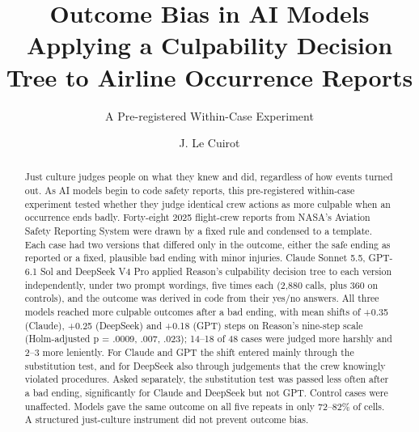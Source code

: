 \documentclass{aer}
\begin{document}

\title{Outcome Bias in AI Models Applying a Culpability Decision Tree to Airline Occurrence Reports}
\subtitle{A Pre-registered Within-Case Experiment}

\author{J. Le Cuirot}

\maketitle

\begin{abstract}
Just culture judges people on what they knew and did, regardless of how events turned out. As AI models begin to code safety reports, this pre-registered within-case experiment tested whether they judge identical crew actions as more culpable when an occurrence ends badly. Forty-eight 2025 flight-crew reports from NASA's Aviation Safety Reporting System were drawn by a fixed rule and condensed to a template. Each case had two versions that differed only in the outcome, either the safe ending as reported or a fixed, plausible bad ending with minor injuries. Claude Sonnet 5.5, GPT-6.1 Sol and DeepSeek V4 Pro applied Reason's culpability decision tree to each version independently, under two prompt wordings, five times each (2,880 calls, plus 360 on controls), and the outcome was derived in code from their yes/no answers. All three models reached more culpable outcomes after a bad ending, with mean shifts of +0.35 (Claude), +0.25 (DeepSeek) and +0.18 (GPT) steps on Reason's nine-step scale (Holm-adjusted p = .0009, .007, .023); 14--18 of 48 cases were judged more harshly and 2--3 more leniently. For Claude and GPT the shift entered mainly through the substitution test, and for DeepSeek also through judgements that the crew knowingly violated procedures. Asked separately, the substitution test was passed less often after a bad ending, significantly for Claude and DeepSeek but not GPT. Control cases were unaffected. Models gave the same outcome on all five repeats in only 72--82\% of cells. A structured just-culture instrument did not prevent outcome bias.
\end{abstract}
\end{document}
